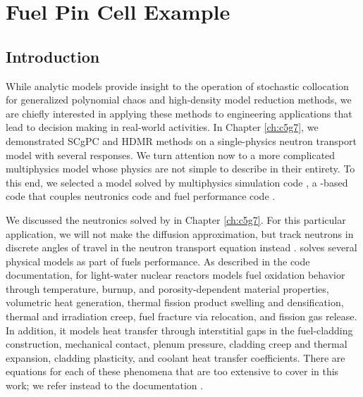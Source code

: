 
\chapter{Fuel Pin Cell Example} %

\label{ch:mammoth} %



\section{Introduction}
While analytic models provide insight to the operation of stochastic collocation for generalized polynomial chaos and high-density
model reduction methods, we are chiefly interested in applying these methods to engineering applications that lead to
decision making in real-world activities.  
In Chapter \ref{ch:c5g7}, we demonstrated SCgPC and HDMR methods on a single-physics neutron transport model
with several responses.  We turn attention now to a more complicated multiphysics model whose physics are not
simple to describe in their entirety.
To this end, we selected a model solved by multiphysics simulation code \mammoth{}, a \moose{}-based
code that couples neutronics code \rattlesnake{} \cite{rattlesnake} and fuel performance code \bison{}
\cite{bison}.

We discussed the neutronics solved by \rattlesnake{} in Chapter \ref{ch:c5g7}.  For this particular
application, we will not make the diffusion approximation, but track neutrons in discrete angles of travel
in the neutron transport equation instead \cite{lewistrans}.  \bison{} solves several physical models as part
of fuels performance.  As described in the code documentation, for light-water nuclear reactors \bison{} models 
fuel oxidation behavior through
temperature, burnup, and porosity-dependent material properties, volumetric heat generation, thermal fission
product swelling and densification, thermal and irradiation creep, fuel fracture via relocation, and fission
gas release.  In addition, it models heat transfer through interstitial gaps in the fuel-cladding
construction, mechanical contact, plenum pressure, cladding creep and thermal expansion, cladding plasticity,
and coolant heat transfer coefficients.  There are equations for each of these phenomena that are too
extensive to cover in this work; we refer instead to the \bison{} documentation \cite{bison}.

